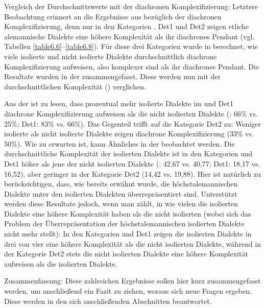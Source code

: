 {Vergleich der Durchschnittswerte mit der diachronen Komplexifizierung:} Letztere Beobachtung erinnert an die Ergebnisse aus  bezüglich der diachronen Komplexifizierung, denn nur in den Kategorien , Det1 und Det2 zeigen etliche alemannische Dialekte eine höhere Komplexität als ihr diachrones Pendant (vgl. Tabellen \ref{table6.6}–\ref{table6.8}). Für diese drei Kategorien wurde in  berechnet, wie viele isolierte und nicht isolierte Dialekte durchschnittlich diachrone Komplexifizierung aufweisen, also komplexer sind als ihr diachrones Pendant. Die Resultate wurden in der  zusammengefasst. Diese werden nun mit der durchschnittlichen Komplexität () verglichen.

Aus der  ist zu lesen, dass prozentual mehr isolierte Dialekte im  und Det1 diachrone Komplexifizierung aufweisen als die nicht isolierten Dialekte (: 66\% vs. 25\%; Det1: 83\% vs. 66\%). Das Gegenteil trifft auf die Kategorie Det2 zu: Weniger isolierte als nicht isolierte Dialekte zeigen diachrone Komplexifizierung (33\% vs. 50\%). Wie zu erwarten ist, kann Ähnliches in der  beobachtet werden. Die durchschnittliche Komplexität der isolierten Dialekte ist in den Kategorien  und Det1 höher als jene der nicht isolierten Dialekte (: 42,67 vs. 40,77; Det1: 18,17 vs. 16,52), aber geringer in der Kategorie Det2 (14,42 vs. 19,88). Hier ist natürlich zu berücksichtigen, dass, wie bereits erwähnt wurde, die höchstalemannischen Dialekte unter den isolierten Dialekten überrepräsentiert sind. Unterstützt werden diese Resultate jedoch, wenn man zählt, in wie vielen  die isolierten Dialekte eine höhere Komplexität haben als die nicht isolierten (wobei sich das Problem der Überrepräsentation der höchstalemannischen isolierten Dialekte nicht mehr stellt): In den Kategorien  und Det1 zeigen die isolierten Dialekte in drei von vier  eine höhere Komplexität als die nicht isolierten Dialekte, während in der Kategorie Det2 stets die nicht isolierten Dialekte eine höhere Komplexität aufweisen als die isolierten Dialekte.

{Zusammenfassung:} Diese zahlreichen Ergebnisse sollen hier kurz zusammengefasst werden, um anschließend ein Fazit zu ziehen, woraus sich neue Fragen ergeben. Diese werden in den sich anschließenden Abschnitten beantwortet.

